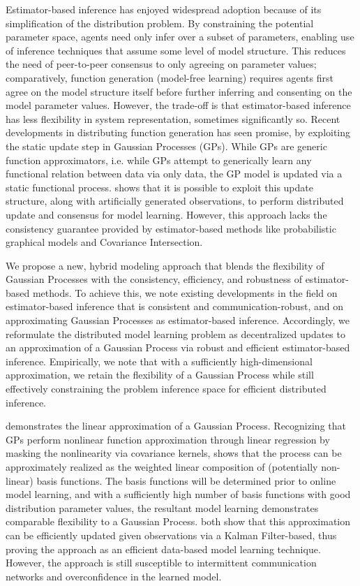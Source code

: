 Estimator-based inference has enjoyed widespread adoption because of its simplification of the distribution problem. By constraining the potential parameter space, agents need only infer over a subset of parameters, enabling use of inference techniques that assume some level of model structure. This reduces the need of peer-to-peer consensus to only agreeing on parameter values; comparatively, function generation (model-free learning) requires agents first agree on the model structure itself before further inferring and consenting on the model parameter values. However, the trade-off is that estimator-based inference has less flexibility in system representation, sometimes significantly so. Recent developments in distributing function generation has seen promise, by exploiting the static update step in Gaussian Processes (GPs). While GPs are generic function approximators, i.e. while GPs attempt to generically learn any functional relation between data via only data, the GP model is updated via a static functional process. \cite{allamraju2017communication} shows that it is possible to exploit this update structure, along with artificially generated observations, to perform distributed update and consensus for model learning. However, this approach lacks the consistency guarantee provided by estimator-based methods like probabilistic graphical models and Covariance Intersection.

We propose a new, hybrid modeling approach that blends the flexibility of Gaussian Processes with the consistency, efficiency, and robustness of estimator-based methods. To achieve this, we note existing developments in the field on estimator-based inference that is consistent and communication-robust, and on approximating Gaussian Processes as estimator-based inference. Accordingly, we reformulate the distributed model learning problem as decentralized updates to an approximation of a Gaussian Process via robust and efficient estimator-based inference. Empirically, we note that with a sufficiently high-dimensional approximation, we retain the flexibility of a Gaussian Process while still effectively constraining the problem inference space for efficient distributed inference.

\cite{jadaliha2012environmental} demonstrates the linear approximation of a Gaussian Process. Recognizing that GPs perform nonlinear function approximation through linear regression by masking the nonlinearity via covariance kernels, \cite{jadaliha2012environmental} shows that the process can be approximately realized as the weighted linear composition of (potentially non-linear) basis functions. The basis functions will be determined prior to online model learning, and with a sufficiently high number of basis functions with good distribution parameter values, the resultant model learning demonstrates comparable flexibility to a Gaussian Process. \cite{jadaliha2012environmental, cui2015mutual} both show that this approximation can be efficiently updated given observations via a Kalman Filter-based, thus proving the approach as an efficient data-based model learning technique. However, the approach is still susceptible to intermittent communication networks and overconfidence in the learned model.

